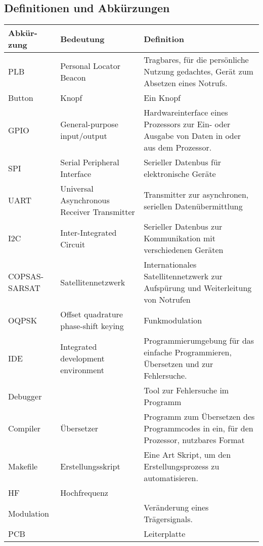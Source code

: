 \subsection{Definitionen und Abkürzungen}
\begin{tabular}{| p{2cm} |p{3cm}| p{11cm} |}
	
	\hline
	\textbf{Abkür-} \newline \textbf{zung} & 
	\textbf{Bedeutung} & \textbf{Definition}\\
	\hline
	
	PLB & 
	Personal Locator Beacon &
	 Tragbares, für die persönliche Nutzung gedachtes, Gerät zum Absetzen eines Notrufs.\\
	\hline
	
	Button & 
	Knopf &
	Ein Knopf \\
	\hline
	
	GPIO & 
	General-purpose input/output &
	Hardwareinterface eines Prozessors zur Ein- oder Ausgabe von Daten in oder aus dem Prozessor.\\ 
	\hline
	
	SPI & 
	Serial Peripheral Interface &
	Serieller Datenbus für elektronische Geräte \\
	\hline
	
	UART &
	Universal Asynchronous Receiver Transmitter &
	Transmitter zur asynchronen, seriellen Datenübermittlung \\
	\hline
	
	I2C &
	Inter-Integrated Circuit &
	Serieller Datenbus zur Kommunikation mit verschiedenen Geräten\\
	\hline
	
	COPSAS- SARSAT & 
	Satellitennetzwerk &
	Internationales Satellitennetzwerk zur Aufspürung und Weiterleitung von Notrufen\\
	\hline
	
	OQPSK & 
	Offset quadrature phase-shift keying &
	Funkmodulation	\\
	\hline
	
	IDE & Integrated development environment
	 & Programmierumgebung für das einfache Programmieren, Übersetzen und zur Fehlersuche.
	\\
	\hline
	
	Debugger & 
	 & Tool zur Fehlersuche im Programm
	\\
	\hline
	
	Compiler & 
	Übersetzer &
	Programm zum Übersetzen des Programmcodes in ein, für den Prozessor, nutzbares Format
	\\
	\hline
	
	Makefile & 
	Erstellungsskript
	& Eine Art Skript, um den Erstellungsprozess zu automatisieren.
	\\
	\hline

	HF & 
	Hochfrequenz
	& 
	\\
	\hline	

	Modulation & 
	& Veränderung eines Trägersignals.
	\\
	\hline
	
	PCB & 
	& Leiterplatte
	\\
	\hline
	
\end{tabular}
